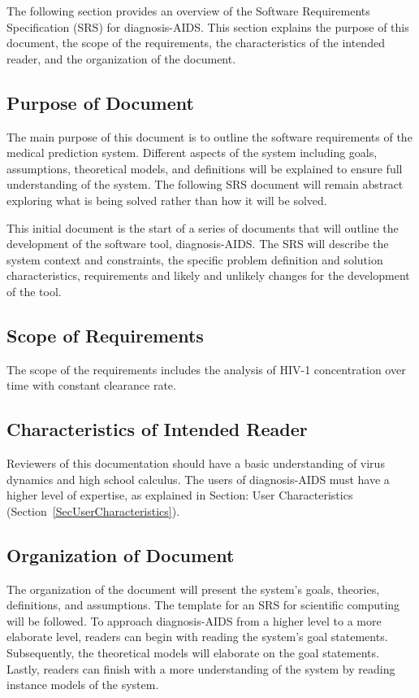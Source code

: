 \documentclass[12pt]{article}
\begin{document}
The following section provides an overview of the Software Requirements 
Specification (SRS) for diagnosis-AIDS. This section explains the purpose of 
this document, the scope of the requirements, the characteristics of the 
intended reader, and the organization of the document.


\subsection{Purpose of Document}

The main purpose of this document is to outline the software requirements of the 
medical prediction system. Different aspects of the system including goals, 
assumptions, theoretical models, and definitions will be explained to ensure 
full understanding of the system. The following SRS document will remain 
abstract exploring what is being solved rather than how it will be solved.

This initial document is the start of a series of documents that will 
outline the development of the software tool, diagnosis-AIDS. The SRS will 
describe the system context and constraints, the specific problem definition and 
solution characteristics, requirements and likely and unlikely changes for the 
development of the tool.

\subsection{Scope of Requirements} 

The scope of the requirements includes the analysis of HIV-1 concentration 
over time with constant clearance rate.

\subsection{Characteristics of Intended Reader} \label{sec_IntendedReader}

Reviewers of this documentation should have a basic understanding of virus 
dynamics and high school calculus. The users of diagnosis-AIDS must have a 
higher level of expertise, as explained in Section: User Characteristics
(Section~\ref{SecUserCharacteristics}).

\subsection{Organization of Document}

The organization of the document will present the system's goals, theories, 
definitions, and assumptions. The template for an SRS for scientific computing 
will be followed. To approach diagnosis-AIDS from a higher level to a more 
elaborate level, readers can begin with reading the system's goal statements. 
Subsequently, the theoretical models will elaborate on the goal statements. 
Lastly, 
readers can finish with a more  understanding of the system by reading instance 
models of the system. 
\end{document}

